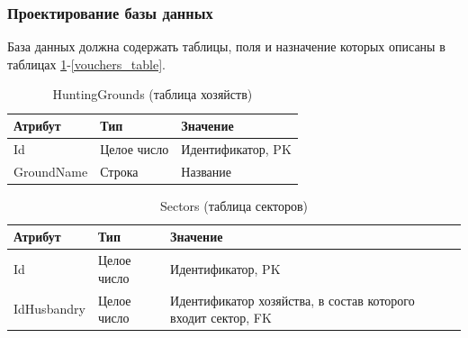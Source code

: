 	\subsubsection{Проектирование базы данных}

	База данных должна содержать таблицы, поля и назначение которых описаны в таблицах 
	\ref{hgtable}-\ref{vouchers_table}.
	
	\begin{table}[h] 
		\begin{center}
			\caption{HuntingGrounds (таблица хозяйств)}
			\label{hgtable}
			\begin{tabular}{| p{3cm} | p{3cm} | p{8cm} |}
				\hline
				\textbf{Атрибут} 	& \textbf{Тип} & \textbf{Значение} \\
				\hline
				Id 					& Целое число &	Идентификатор, PK \\ 
				\hline
				GroundName 			& Строка &	Название \\ 
				\hline
			\end{tabular}
		\end{center}
	\end{table}

	\begin{table}[h] 
		\begin{center}
			\caption{Sectors (таблица секторов)}
			\label{sec_table}
			\begin{tabular}{| p{3cm} | p{3cm} | p{8cm} |}
				\hline
				\textbf{Атрибут} 	& \textbf{Тип} & \textbf{Значение} \\
				\hline
				Id 					& Целое число &	Идентификатор, PK \\ 
				\hline
				IdHusbandry 		& Целое число &	Идентификатор хозяйства, в состав которого входит сектор, FK \\
				\hline
			\end{tabular}
		\end{center}
	\end{table}

